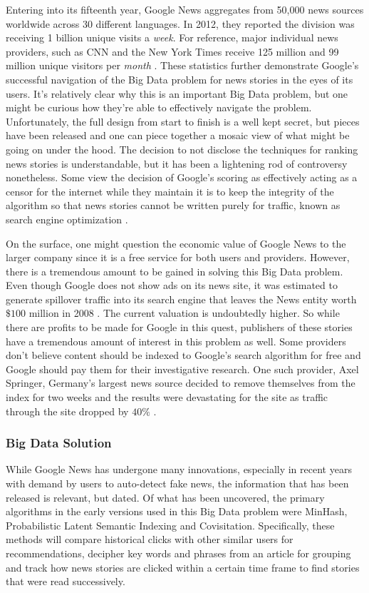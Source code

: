 \documentclass[sigconf]{acmart}
\begin{document}
Entering into its fifteenth year, Google News aggregates from 50,000 news sources worldwide across 30 different languages. In 2012, they reported the division was receiving 1 billion unique visits a \emph{week}\cite{krishna}. For reference, major individual news providers, such as CNN and the New York Times receive 125 million and 99 million unique visitors per \emph{month} \cite{nytimes}. These statistics further demonstrate Google's successful navigation of the Big Data problem for news stories in the eyes of its users. 
It's relatively clear why this is an important Big Data problem, but one might be curious how they're able to effectively navigate the problem. Unfortunately, the full design from start to finish is a well kept secret, but pieces have been released and one can piece together a mosaic view of what might be going on under the hood. The decision to not disclose the techniques for ranking news stories is understandable, but it has been a lightening rod of controversy nonetheless. Some view the decision of Google's scoring as effectively acting as a censor for the internet while they maintain it is to keep the integrity of the algorithm so that news stories cannot be written purely for traffic, known as search engine optimization \cite{censor}. 

On the surface, one might question the economic value of Google News to the larger company since it is a free service for both users and providers. However, there is a tremendous amount to be gained in solving this Big Data problem. Even though Google does not show ads on its news site, it was estimated to generate spillover traffic into its search engine that leaves the News entity worth $\$100$ million in 2008 \cite{newsvalue}. The current valuation is undoubtedly higher. So while there are profits to be made for Google in this quest, publishers of these stories have a tremendous amount of interest in this problem as well. Some providers don't believe content should be indexed to Google's search algorithm for free and Google should pay them for their investigative research. One such provider, Axel Springer, Germany's largest news source decided to remove themselves from the index for two weeks and the results were devastating for the site as traffic through the site dropped by $40\%$ \cite{springer}.

\subsubsection{Big Data Solution}
While Google News has undergone many innovations, especially in recent years with demand by users to auto-detect fake news, the information that has been released is relevant, but dated. Of what has been uncovered, the primary algorithms in the early versions used in this Big Data problem were MinHash, Probabilistic Latent Semantic Indexing and Covisitation. Specifically, these methods will compare historical clicks with other similar users for recommendations, decipher key words and phrases from an article for grouping and track how news stories are clicked within a certain time frame to find stories that were read successively.  
\end{document}
